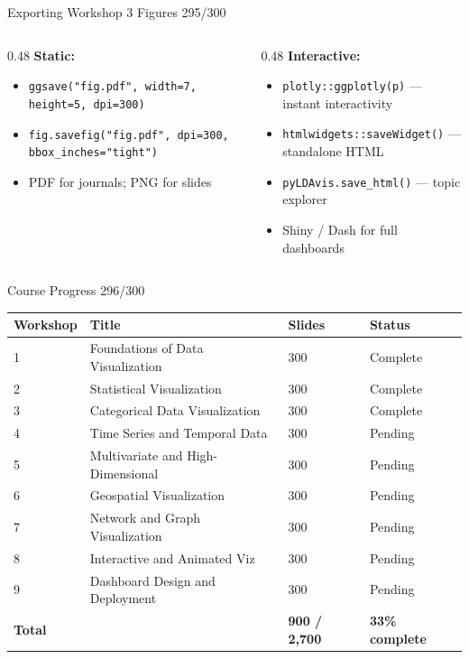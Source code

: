 \documentclass[10pt]{beamer}
\newcommand{\smark}[1]{\hfill{\scriptsize\color{codegray}#1}}
\begin{document}
\begin{frame}{Exporting Workshop 3 Figures}
\smark{295/300}
\begin{columns}[T]
\begin{column}{0.48\textwidth}
    \textbf{Static:}
    \begin{itemize}
        \item \texttt{ggsave("fig.pdf", width=7, height=5, dpi=300)}
        \item \texttt{fig.savefig("fig.pdf", dpi=300, bbox\_inches="tight")}
        \item PDF for journals; PNG for slides
    \end{itemize}
\end{column}
\begin{column}{0.48\textwidth}
    \textbf{Interactive:}
    \begin{itemize}
        \item \texttt{plotly::ggplotly(p)} --- instant interactivity
        \item \texttt{htmlwidgets::saveWidget()} --- standalone HTML
        \item \texttt{pyLDAvis.save\_html()} --- topic explorer
        \item Shiny / Dash for full dashboards
    \end{itemize}
\end{column}
\end{columns}
\end{frame}

\begin{frame}{Course Progress}
\smark{296/300}
\centering\small
\begin{tabular}{@{}llll@{}}
    \toprule
    \textbf{Workshop} & \textbf{Title} & \textbf{Slides} & \textbf{Status} \\
    \midrule
    1 & Foundations of Data Visualization     & 300 & Complete \\
    2 & Statistical Visualization             & 300 & Complete \\
    3 & Categorical Data Visualization        & 300 & Complete \\
    4 & Time Series and Temporal Data         & 300 & Pending \\
    5 & Multivariate and High-Dimensional     & 300 & Pending \\
    6 & Geospatial Visualization              & 300 & Pending \\
    7 & Network and Graph Visualization       & 300 & Pending \\
    8 & Interactive and Animated Viz           & 300 & Pending \\
    9 & Dashboard Design and Deployment       & 300 & Pending \\
    \midrule
    \textbf{Total} & & \textbf{900 / 2{,}700} & \textbf{33\% complete} \\
    \bottomrule
\end{tabular}
\end{frame}
\end{document}
